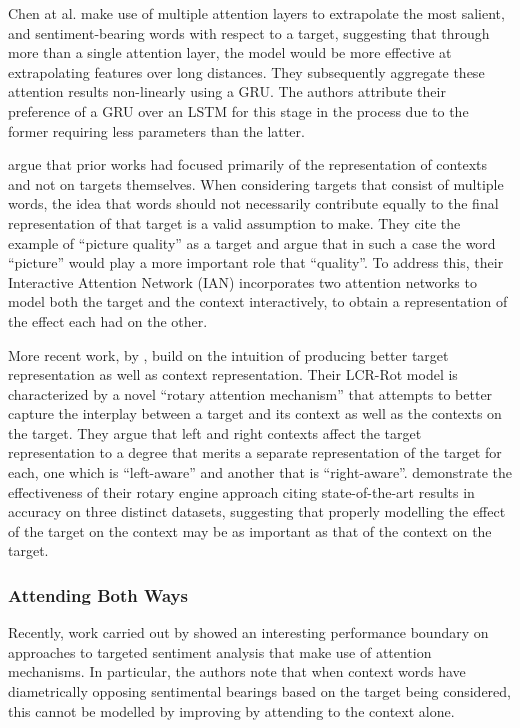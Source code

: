 \documentclass[../../fyp.tex]{subfiles}
\begin{document}
Chen at al. \citep{chen2017} make use of multiple attention layers to extrapolate the most salient, and sentiment-bearing words with respect to a target, suggesting that through more than a single attention layer, the model would be more effective at extrapolating features over long distances. They subsequently aggregate these attention results non-linearly using a GRU. The authors attribute their preference of a GRU over an LSTM for this stage in the process due to the former requiring less parameters than the latter.

\citet{dehongma2017} argue that prior works had focused primarily of the representation of contexts and not on targets themselves. When considering targets that consist of multiple words, the idea that words should not necessarily contribute equally to the final representation of that target is a valid assumption to make. They cite the example of \enquote{picture quality} as a target and argue that in such a case the word \enquote{picture} would play a more important role that \enquote{quality}. To address this, their Interactive Attention Network (IAN) incorporates two attention networks to model both the target and the context interactively, to obtain a representation of the effect each had on the other.

More recent work, by \citet{zheng2018}, build on the intuition of producing better target representation as well as context representation. Their LCR-Rot model is characterized by a novel \enquote{rotary attention mechanism} that attempts to better capture the interplay between a target and its context as well as the contexts on the target. They argue that left and right contexts affect the target representation to a degree that merits a separate representation of the target for each, one which is \enquote{left-aware} and another that is \enquote{right-aware}. \citet{zheng2018} demonstrate the effectiveness of their rotary engine approach citing state-of-the-art results in accuracy on three distinct datasets, suggesting that properly modelling the effect of the target on the context may be as important as that of the context on the target.

\subsubsection{Attending Both Ways}
Recently, work carried out by \citet{wang2018} showed an interesting performance boundary on approaches to targeted sentiment analysis that make use of attention mechanisms. In particular, the authors note that when context words have diametrically opposing sentimental bearings based on the target being considered, this cannot be modelled by improving by attending to the context alone.
\end{document}
